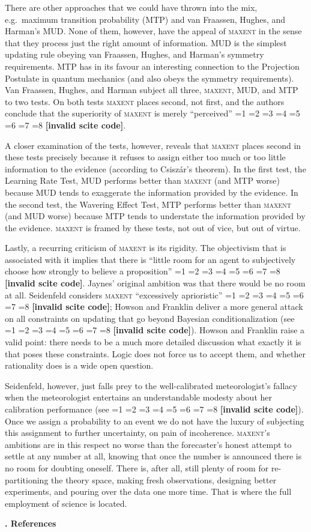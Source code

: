 \documentclass[12pt]{article}
\newcommand{\kapt}[1]{\textbf{{\thechap}. #1}\addtocounter{chap}{1}}
\newcommand{\qeins}[1]{``#1''}
\newif\ifNumericalOrYear
\newcommand{\PageP}{p.~}
\newcommand{\PageP}{}
\newcommand{\scite}[3]{\ifnum#1=1\ifNumericalOrYear\citep{#2}\else\citeyearpar{#2}\fi\else
\ifnum#1=2\ifNumericalOrYear\citep[#3]{#2}\else\citep[{\PageP}#3]{#2}\fi\else
\ifnum#1=3\ifNumericalOrYear(\citet[#3]{#2})\else\citep[{\PageP}#3]{#2}\fi\else
\ifnum#1=4\ifNumericalOrYear\citet{#2}\else\citet{#2}\fi\else
\ifnum#1=5\ifNumericalOrYear(\citet{#2})\else\citep{#2}\fi\else
\ifnum#1=6\ifNumericalOrYear(\citet[#3]{#2})\else\citep[{\PageP}#3]{#2}\fi\else
\ifnum#1=7\ifNumericalOrYear\citep{#2}\else\citealp{#2}\fi\else
\ifnum#1=8\ifNumericalOrYear\citep[#3]{#2}\else\citealp[{\PageP}#3]{#2}\fi\else
\textbf{[invalid scite code]}\fi\fi\fi\fi\fi\fi\fi\fi}
\begin{document}
There are other approaches that we could have thrown into the mix,
e.g.\ maximum transition probability (MTP) and van Fraassen, Hughes,
and Harman's MUD. None of them, however, have the appeal of
\textsc{maxent} in the sense that they process just the right amount
of information. MUD is the simplest updating rule obeying van
Fraassen, Hughes, and Harman's symmetry requirements. MTP has in its
favour an interesting connection to the Projection Postulate in
quantum mechanics (and also obeys the symmetry requirements). Van
Fraassen, Hughes, and Harman subject all three, \textsc{maxent}, MUD,
and MTP to two tests. On both tests \textsc{maxent} places second, not
first, and the authors conclude that the superiority of
\textsc{maxent} is merely \qeins{perceived}
\scite{2}{fraassenetal86}{462}. 

A closer examination of the tests, however, reveals that
\textsc{maxent} places second in these tests precisely because it
refuses to assign either too much or too little information to the
evidence (according to Csisz{\'a}r's theorem). In the first test, the
Learning Rate Test, MUD performs better than \textsc{maxent} (and MTP
worse) because MUD tends to exaggerate the information provided by the
evidence. In the second test, the Wavering Effect Test, MTP performs
better than \textsc{maxent} (and MUD worse) because MTP tends to
understate the information provided by the evidence. \textsc{maxent}
is framed by these tests, not out of vice, but out of virtue.

Lastly, a recurring criticism of \textsc{maxent} is its rigidity. The
objectivism that is associated with it implies that there is
\qeins{little room for an agent to subjectively choose how strongly to
  believe a proposition} \scite{2}{williamson09}{4}. Jaynes' original
ambition was that there would be no room at all. Seidenfeld considers
\textsc{maxent} \qeins{excessively aprioristic}
\scite{2}{seidenfeld79}{414}; Howson and Franklin deliver a more
general attack on all constraints on updating that go beyond Bayesian
conditionalization (see \scite{7}{howsonfranklin94}{}). Howson and
Franklin raise a valid point: there needs to be a much more detailed
discussion what exactly it is that poses these constraints. Logic does
not force us to accept them, and whether rationality does is a wide
open question. 

Seidenfeld, however, just falls prey to the well-calibrated
meteorologist's fallacy when the meteorologist entertains an
understandable modesty about her calibration performance (see
\scite{7}{dawid82}{}). Once we assign a probability to an event we do
not have the luxury of subjecting this assignment to further
uncertainty, on pain of incoherence. \textsc{maxent}'s ambitions are
in this respect no worse than the forecaster's honest attempt to
settle at any number at all, knowing that once the number is announced
there is no room for doubting oneself. There is, after all, still
plenty of room for re-partitioning the theory space, making fresh
observations, designing better experiments, and pouring over the data
one more time. That is where the full employment of science is
located.




\kapt{References}



\end{document}
